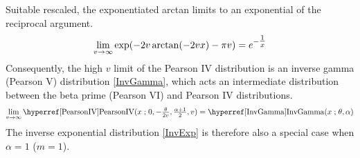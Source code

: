 Suitable rescaled,  the exponentiated arctan limits to an exponential of the reciprocal argument.
\[
 \lim_{v\rightarrow\infty} \exp(- 2 v  \arctan( -2 v x)  -  \pi  v) =  e^{-\tfrac{1}{x}}
 \checked
 \notag
\] 
 Consequently, the high $v$ limit of the Pearson IV distribution is an inverse gamma (Pearson V) distribution \eqref{InvGamma}, which acts an intermediate distribution between the beta prime (Pearson VI) and Pearson IV distributions.
\[
 \lim_{v\rightarrow\infty} \opr{PearsonIV}(x\given 0,-\tfrac{\theta}{2 v}, \tfrac{\alpha+1}{2},v) = \opr{InvGamma}(x\given \theta, \alpha) 
 \checked
 \notag
\]
The inverse exponential distribution \eqref{InvExp} is therefore also a special case when $\alpha=1$ ($m=1$).




\clearpage
